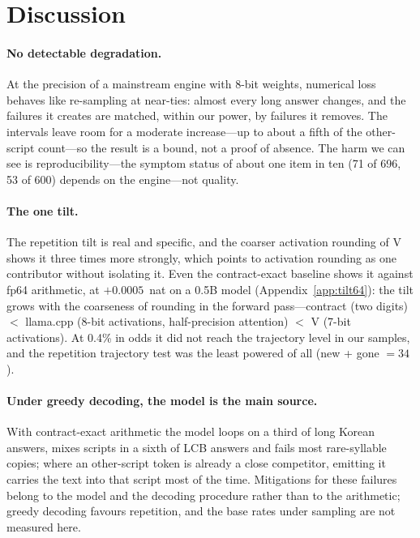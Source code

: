 \documentclass[11pt]{article}
\begin{document}
\section{Discussion}\label{sec:discussion}

\paragraph{No detectable degradation.}
At the precision of a mainstream engine with 8-bit weights, numerical loss behaves like re-sampling at near-ties: almost every
long answer changes, and the failures it creates are matched, within our power, by failures it removes. The intervals leave
room for a moderate increase---up to about a fifth of the other-script count---so the result is a bound, not a proof of
absence. The harm we can see is reproducibility---the symptom status of about one item in ten (71 of 696, 53 of 600) depends
on the engine---not quality.

\paragraph{The one tilt.}
The repetition tilt is real and specific, and the coarser activation rounding of V shows it three times more strongly, which
points to activation rounding as one contributor without isolating it. Even the contract-exact baseline shows it against fp64
arithmetic, at $+0.0005$~nat on a 0.5B model (Appendix~\ref{app:tilt64}): the tilt grows with the coarseness of rounding in the
forward pass---contract (two digits) $<$ llama.cpp (8-bit activations, half-precision attention) $<$ V (7-bit activations). At
0.4\% in odds it did not reach the trajectory level in our samples, and the repetition trajectory test was the least powered of
all (new + gone $=34$).

\paragraph{Under greedy decoding, the model is the main source.}
With contract-exact arithmetic the model loops on a third of long Korean answers, mixes scripts in a sixth of LCB answers and
fails most rare-syllable copies; where an other-script token is already a close competitor, emitting it carries the text into
that script most of the time. Mitigations for these failures belong to the model and the decoding procedure rather than to
the arithmetic; greedy decoding favours repetition, and the base rates under sampling are not measured here.
\end{document}
